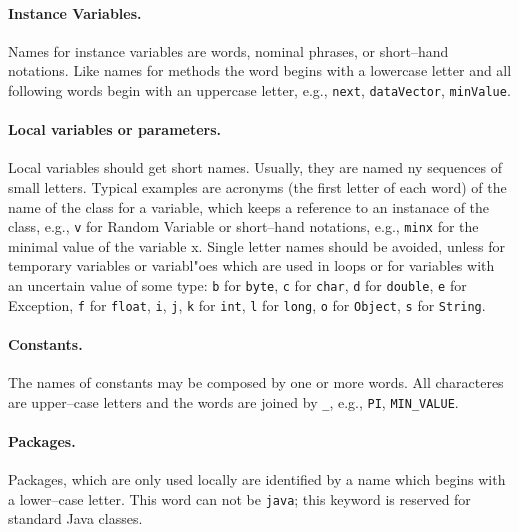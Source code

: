 \paragraph{Instance Variables.} Names for instance variables are
  words, nominal phrases, or short--hand notations. Like names for
  methods the word begins with a lowercase letter and all following
  words begin with an uppercase letter, e.g., \verb|next|,
  \verb|dataVector|,
\verb|minValue|.

\paragraph{Local variables or parameters.} Local variables should get
  short  names. Usually, they are named ny sequences of small
  letters. Typical examples are acronyms (the first letter of each
  word) of the name of the class for a variable, which keeps a
  reference to an instanace of the class, e.g., \verb|v| for Random
  Variable or short--hand notations, e.g., \verb|minx| for the minimal
  value of the variable x. Single letter names should be avoided,
  unless for temporary variables or variabl"oes which are used in
  loops or for variables with an uncertain value of some type:
\verb|b| for \verb|byte|, \verb|c| for \verb|char|, \verb|d| for
  \verb|double|, \verb|e| for Exception, \verb|f| for \verb|float|,
  \verb|i|,
\verb|j|, \verb|k| for \verb|int|, \verb|l| for \verb|long|, \verb|o|
  for \verb|Object|, \verb|s| for \verb|String|.

\paragraph{Constants.} The names of constants may be composed by one
  or more words. All characteres are upper--case letters and the words
  are joined by \verb|_|, e.g., \verb|PI|,  \verb|MIN_VALUE|.

\paragraph{Packages.} Packages, which are only used locally are
  identified by a name which begins with a lower--case letter. This
  word can not be \verb|java|; this keyword is reserved for
  standard Java classes.



